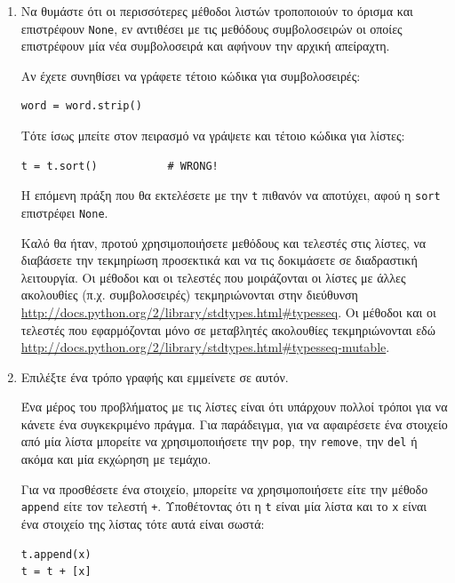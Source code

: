 \documentclass[10pt]{book}
\begin{document}
\begin{enumerate}

\item  Να θυμάστε ότι οι περισσότερες μέθοδοι λιστών τροποποιούν το όρισμα και επιστρέφουν {\tt None}, εν αντιθέσει με τις μεθόδους συμβολοσειρών οι οποίες επιστρέφουν μία νέα συμβολοσειρά και αφήνουν την αρχική απείραχτη.
  
Αν έχετε συνηθίσει να γράφετε τέτοιο κώδικα για συμβολοσειρές:  

\begin{verbatim}
word = word.strip()
\end{verbatim}

Τότε ίσως μπείτε στον πειρασμό να γράψετε και τέτοιο κώδικα για λίστες:

\begin{verbatim}
t = t.sort()           # WRONG!
\end{verbatim}

Η επόμενη πράξη που θα εκτελέσετε με την {\tt t} πιθανόν να αποτύχει, αφού η {\tt sort} επιστρέφει {\tt None}.

Καλό θα ήταν, προτού χρησιμοποιήσετε μεθόδους και τελεστές στις λίστες, να διαβάσετε την τεκμηρίωση προσεκτικά και να τις δοκιμάσετε σε διαδραστική λειτουργία. Οι μέθοδοι και οι τελεστές που μοιράζονται οι λίστες με άλλες ακολουθίες (π.χ. συμβολοσειρές) τεκμηριώνονται στην διεύθυνση \url{http://docs.python.org/2/library/stdtypes.html#typesseq}. Οι μέθοδοι και οι τελεστές που εφαρμόζονται μόνο σε μεταβλητές ακολουθίες τεκμηριώνονται εδώ \url{http://docs.python.org/2/library/stdtypes.html#typesseq-mutable}.


\item  Επιλέξτε ένα τρόπο γραφής και εμμείνετε σε αυτόν.

Ένα μέρος του προβλήματος με τις λίστες είναι ότι υπάρχουν πολλοί τρόποι για να κάνετε ένα συγκεκριμένο πράγμα. Για παράδειγμα, για να αφαιρέσετε ένα στοιχείο από μία λίστα μπορείτε να χρησιμοποιήσετε την {\tt pop}, την {\tt remove}, την  {\tt del} ή ακόμα και μία εκχώρηση με τεμάχιο.

Για να προσθέσετε ένα στοιχείο, μπορείτε να χρησιμοποιήσετε είτε την μέθοδο {\tt append} είτε τον τελεστή {\tt +}. Υποθέτοντας ότι η {\tt t} είναι μία λίστα και το {\tt x} είναι ένα στοιχείο της λίστας τότε αυτά είναι σωστά:

\begin{verbatim}
t.append(x)
t = t + [x]
\end{verbatim}


\end{enumerate}
\end{document}
